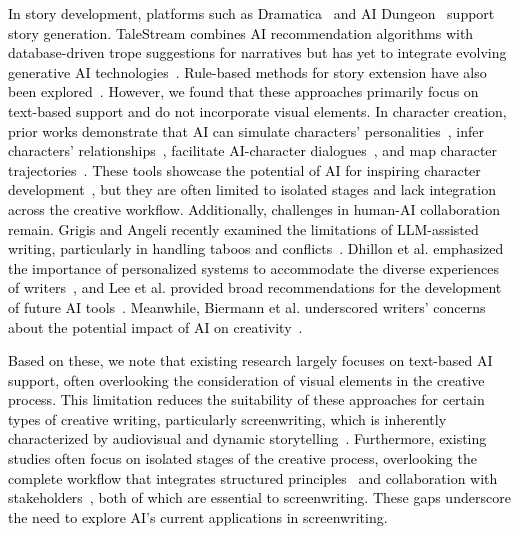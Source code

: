 \textcolor{black}{In story development, platforms such as Dramatica~\cite{dramatica} and AI Dungeon~\cite{aidungeon} support story generation. TaleStream combines AI recommendation algorithms with database-driven trope suggestions for narratives but has yet to integrate evolving generative AI technologies~\cite{chou2023talestream}. Rule-based methods for story extension have also been explored~\cite{lebowitz1984creating, meehan1977tale, riedl2010narrative}. However, we found that these approaches primarily focus on text-based support and do not incorporate visual elements. In character creation, prior works demonstrate that AI can simulate characters' personalities~\cite{cavazza2001characters}, infer characters' relationships~\cite{chaturvedi2017unsupervised}, facilitate AI-character dialogues~\cite{10.1145/3613904.3642105}, and map character trajectories~\cite{chung2022talebrush}. These tools showcase the potential of AI for inspiring character development~\cite{10.1145/3450741.3465253, shakeri2021saga, yuan2022wordcraft}, but they are often limited to isolated stages and lack integration across the creative workflow. Additionally, challenges in human-AI collaboration remain. Grigis and Angeli recently examined the limitations of LLM-assisted writing, particularly in handling taboos and conflicts~\cite{10.1145/3656650.3656688}. Dhillon et al. emphasized the importance of personalized systems to accommodate the diverse experiences of writers~\cite{10.1145/3613904.3642134}, and Lee et al. provided broad recommendations for the development of future AI tools~\cite{10.1145/3613904.3642697}. Meanwhile, Biermann et al. underscored writers’ concerns about the potential impact of AI on creativity~\cite{biermann2022tool}.}

\textcolor{black}{Based on these, we note that existing research largely focuses on text-based AI support, often overlooking the consideration of visual elements in the creative process. 
This limitation reduces the suitability of these approaches for certain types of creative writing, particularly screenwriting, which is inherently characterized by audiovisual and dynamic storytelling~\cite{senje2017formatting}. Furthermore, existing studies often focus on isolated stages of the creative process, overlooking the complete workflow that integrates structured principles~\cite{mckee1997substance} and collaboration with stakeholders~\cite{taylor2024one, cake2021collaborative, batty2018script}, both of which are essential to screenwriting. These gaps underscore the need to explore AI's current applications in screenwriting.}


